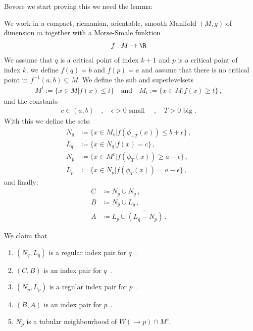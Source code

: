 Bevore we start proving this we need the lemma: 

\begin{lemma}\label{lem: The Main Lemma Np is tubular}
	We work in a compact, riemanian, orientable, smooth Manifold $(M,g)$ of dimension $m$ together with a Morse-Smale funktion 
	\begin{align}
		f: M\to \R
	\end{align}
	We assume that $q$ is a critical point of index $k+1$ and $p$ is a critical point of index $k$. we define $f(q)=b$ and $f(p)=a$ and assume that there is no critical point in $f^{-1}(a,b)\subseteq M$. We define the sub and superlevelsets 
	\begin{align}
		M^t:=\{ x\in M | f(x)\leq t \} \quad \text{and}\quad M_t:=\{ x\in M | f(x)\geq t \} \, ,
	\end{align} and the constants 
	\begin{align}
		c \in (a,b) \quad , \quad \epsilon >0 \text{ small } \quad,\quad T>0 \text{ big .}
	\end{align} With this we define the sets: 
	\begin{align}
		N_q  & \coloneq    \{ x\in M_c |f(\phi_{-T}(x))  \leq b+ \epsilon  \}   \, ,  \\
		L_q  & \coloneq    \{ x\in N_q |f(x)             =    c            \}    \, , \\
		N_p  & \coloneq    \{ x\in M^c |f(\phi_T(x))     \geq a-\epsilon   \}    \, , \\
		L_p  & \coloneq    \{ x\in N_p |f( \phi_T(x))    =    a-\epsilon   \} \, ,
	\end{align} and finally: 
	\begin{align}
		C  & \coloneq  N_p \cup N_q  \, ,                     \\
		B  & \coloneq  N_p \cup L_q   \, ,                   \\
		A  & \coloneq  L_p \cup \mathring{(L_q-N_p)} \, .
	\end{align}
	
	We claim that 
	\begin{enumerate}
		\item $(N_q,L_q)$ is a regular index pair for $q$\, . \label{lem: enum: 1}
		\item $(C,B)$ is an index pair for $q$\, .\label{lem: enum: 2}
		\item $(N_p,L_p)$ is a regular index pair for $p$\, .\label{lem: enum: 3}
		\item $(B,A)$ is an index pair for $p$\, .\label{lem: enum: 4}
		\item $N_p$ is a tubular neighbourhood of $W(\to p)\cap M^c$.\label{lem: enum: 5}
	\end{enumerate}
\end{lemma}

